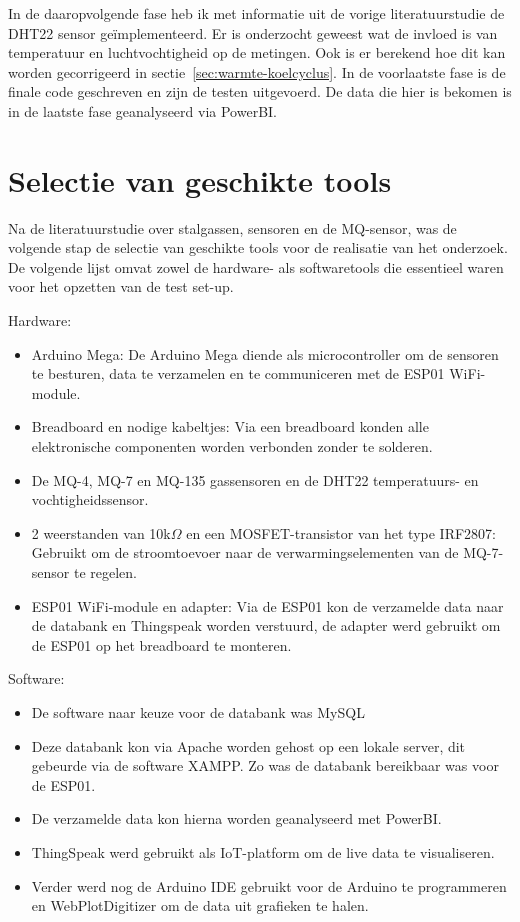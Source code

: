 In de daaropvolgende fase heb ik met informatie uit de vorige literatuurstudie de DHT22 sensor geïmplementeerd. Er is onderzocht geweest wat de invloed is van temperatuur en luchtvochtigheid op de metingen. Ook is er berekend hoe dit kan worden gecorrigeerd in sectie~\ref{sec:warmte-koelcyclus}.
In de voorlaatste fase is de finale code geschreven en zijn de testen uitgevoerd. De data die hier is bekomen is in de laatste fase geanalyseerd via PowerBI.


\section{Selectie van geschikte tools}%
\label{sec:selectie}

Na de literatuurstudie over stalgassen, sensoren en de MQ-sensor, was de volgende stap de selectie van geschikte tools voor de realisatie van het onderzoek. De volgende lijst omvat zowel de hardware- als softwaretools die essentieel waren voor het opzetten van de test set-up.

Hardware:
\begin{itemize}
    \item Arduino Mega: De Arduino Mega diende als microcontroller om de sensoren te besturen, data te verzamelen en te communiceren met de ESP01 WiFi-module.
    \item Breadboard en nodige kabeltjes: Via een breadboard konden alle elektronische componenten worden verbonden zonder te solderen.
    \item De MQ-4, MQ-7 en MQ-135 gassensoren en de DHT22 temperatuurs- en vochtigheidssensor.
    \item 2 weerstanden van 10k$\Omega$ en een MOSFET-transistor van het type IRF2807: Gebruikt om de stroomtoevoer naar de verwarmingselementen van de MQ-7-sensor te regelen.
    \item ESP01 WiFi-module en adapter: Via de ESP01 kon de verzamelde data naar de databank en Thingspeak worden verstuurd, de adapter werd gebruikt om de ESP01 op het breadboard te monteren.
\end{itemize}

Software:
\begin{itemize}
    \item De software naar keuze voor de databank was MySQL
    \item Deze databank kon via Apache worden gehost op een lokale server, dit gebeurde via de software XAMPP. Zo was de databank bereikbaar was voor de ESP01.
    \item De verzamelde data kon hierna worden geanalyseerd met PowerBI.
    \item ThingSpeak werd gebruikt als IoT-platform om de live data te visualiseren.
    \item Verder werd nog de Arduino IDE gebruikt voor de Arduino te programmeren en WebPlotDigitizer om de data uit grafieken te halen.
\end{itemize}




